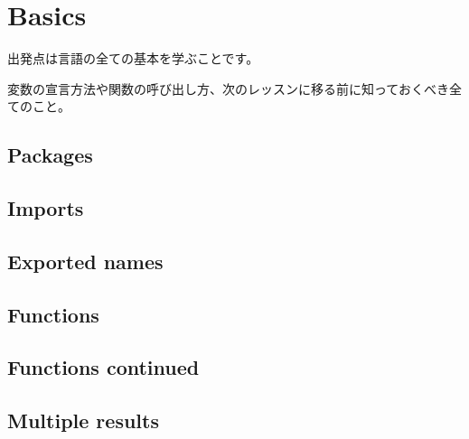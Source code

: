 \section{Basics}

出発点は言語の全ての基本を学ぶことです。

変数の宣言方法や関数の呼び出し方、次のレッスンに移る前に知っておくべき全てのこと。

\subsection{Packages}





\subsection{Imports}





\subsection{Exported names}





\subsection{Functions}





\subsection{Functions continued}





\subsection{Multiple results}


